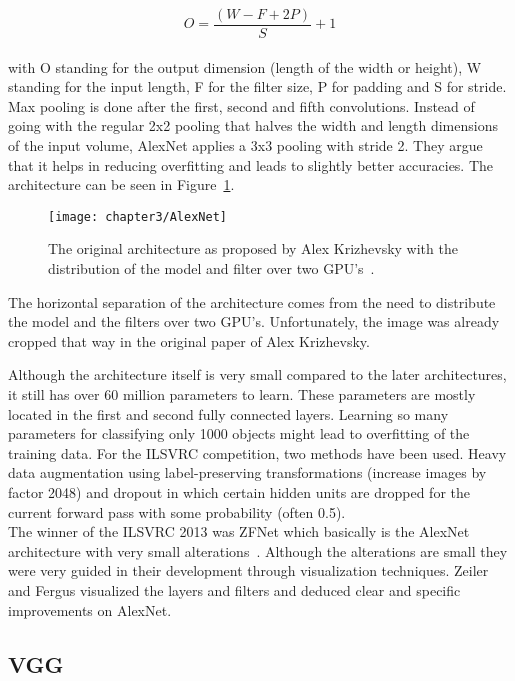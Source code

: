 \[ O = {\frac{(W - F + 2P)}{S}} + 1 \] \\

with O standing for the output dimension (length of the width or height), W standing for the input length, F for the filter size, P for padding and S for stride. Max pooling is done after the first, second and fifth convolutions. Instead of going with the regular 2x2 pooling that halves the width and length dimensions of the input volume, AlexNet applies a 3x3 pooling with stride 2. They argue that it helps in reducing overfitting and leads to slightly better accuracies. The architecture can be seen in Figure~\ref{fig:AlexNet}. \\

\begin{figure}[!h]
  \centering
  \caption{The original architecture as proposed by Alex Krizhevsky with the distribution of the model and filter over two GPU's~\cite{krizhevsky2012imagenet}.}
  \texttt{[image: chapter3/AlexNet]}
  \label{fig:AlexNet}
\end{figure}

\quad

The horizontal separation of the architecture comes from the need to distribute the model and the filters over two GPU's. Unfortunately, the image was already cropped that way in the original paper of Alex Krizhevsky.

Although the architecture itself is very small compared to the later architectures, it still has over 60 million parameters to learn. These parameters are mostly located in the first and second fully connected layers. Learning so many parameters for classifying only 1000 objects might lead to overfitting of the training data. For the ILSVRC competition, two methods have been used. Heavy data augmentation using label-preserving transformations (increase images by factor 2048) and dropout in which certain hidden units are dropped for the current forward pass with some probability (often 0.5). \\

The winner of the ILSVRC 2013 was ZFNet which basically is the AlexNet architecture with very small alterations~\cite{zeiler2014visualizing}. Although the alterations are small they were very guided in their development through visualization techniques. Zeiler and Fergus visualized the layers and filters and deduced clear and specific improvements on AlexNet.\\


\subsection{VGG}

